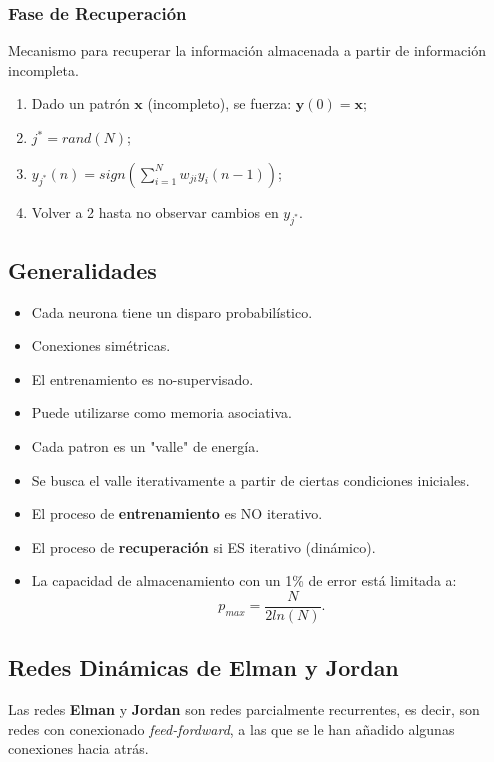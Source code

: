 \documentclass[10pt,a4paper]{article}
\begin{document}
\subsubsection{Fase de Recuperación}
Mecanismo para recuperar la información almacenada a partir de
información incompleta.
\begin{enumerate}
\item Dado un patrón $\mathbf{x}$ (incompleto), se fuerza: $\mathbf{y}(0)=\mathbf{x}$;
\item $j^* = rand(N)$;
\item $y_{j^*}(n) = sign\left(\sum_{i=1}^N w_{ji} y_i (n-1)\right)$;
\item Volver a 2 hasta no observar cambios en $y_{j^*}$.
\end{enumerate}

\subsection{Generalidades}
\begin{multicols}{2}
\begin{itemize}
\item Cada neurona tiene un disparo probabilístico.
\item Conexiones simétricas.
\item El entrenamiento es no-supervisado.
\item Puede utilizarse como memoria asociativa.
\item Cada patron es un "valle" de energía.
\item Se busca el valle iterativamente a partir de ciertas condiciones iniciales.
\item El proceso de \textbf{entrenamiento} es NO iterativo.
\item El proceso de \textbf{recuperación} si ES iterativo (dinámico).
\item La capacidad de almacenamiento con un 1\% de error está limitada a: 
\[p_{max} = \frac{N}{2 ln(N)}.\]
\end{itemize}
\end{multicols}

\subsection{Redes Dinámicas de Elman y Jordan}

Las redes \textbf{Elman} y \textbf{Jordan} son redes parcialmente recurrentes, es decir, son redes con conexionado \textit{feed-fordward}, a las que se le han añadido algunas conexiones hacia atrás.
\end{document}
